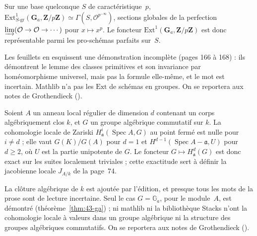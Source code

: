 \begin{encadre}
\begin{theoreme*}\nonverifie
Sur une base quelconque $S$ de caractéristique~$p$, $\mathrm{Ext}^1_{S\text{-gr}}(\mathbf G_a, \mathbf Z/p\mathbf Z) \simeq \Gamma(S, \mathcal O^{p^{-\infty}})$, sections globales de la perfection $\varinjlim(\mathcal O \to \mathcal O \to \cdots)$ pour $x \mapsto x^p$. Le foncteur $\mathrm{Ext}^1(\mathbf G_a, \mathbf Z/p\mathbf Z)$ est donc représentable parmi les pro-schémas parfaits sur~$S$.
\end{theoreme*}
\end{encadre}
{\small Les feuillets en esquissent une démonstration incomplète (pages 166 à 168) : ils démontrent le lemme des classes primitives et son invariance par homéomorphisme universel, mais pas la formule elle-même, et le mot  est incertain. Mathlib n'a pas les $\mathrm{Ext}$ de schémas en groupes. On se reportera aux notes de Grothendieck ().\par}

\begin{encadre}
\begin{theoreme*}\nonverifie
Soient $A$ un anneau local régulier de dimension $d$ contenant un corps algébriquement clos $k$, et $G$ un groupe algébrique commutatif sur $k$. La cohomologie locale de Zariski $H^i_{\mathfrak a}(\operatorname{Spec} A, G)$ au point fermé est nulle pour $i \neq d$ ; elle vaut $G(K)/G(A)$ pour $d = 1$ et $H^{d-1}(\operatorname{Spec} A - \mathfrak a, U)$ pour $d \geq 2$, où $U$ est la partie unipotente de $G$. Le foncteur $G \mapsto H^d_{\mathfrak a}(G)$ est donc exact sur les suites localement triviales ; cette exactitude sert à définir la jacobienne locale $J_{A/k}$ de la page~74.
\end{theoreme*}
\end{encadre}
{\small La clôture algébrique de $k$ est ajoutée par l'édition, et presque tous les mots de la prose sont de lecture incertaine. Seul le cas $G = \mathbb G_a$, pour le module~$A$, est démontré (théorème~\ref{thm:43-ga}) ; ni mathlib ni la bibliothèque Stacks n'ont la cohomologie locale à valeurs dans un groupe algébrique ni la structure des groupes algébriques commutatifs. On se reportera aux notes de Grothendieck ().\par}

